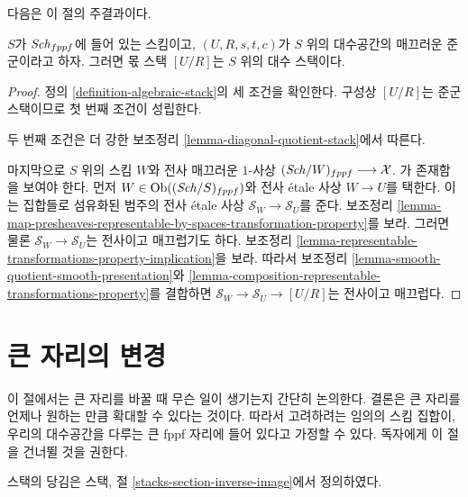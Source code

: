 \noindent
다음은 이 절의 주결과이다.

\begin{theorem}
\label{theorem-smooth-groupoid-gives-algebraic-stack}
$S$가 $\mathit{Sch}_{fppf}$에 들어 있는 스킴이고,
$(U, R, s, t, c)$가 $S$ 위의 대수공간의 매끄러운 준군이라고 하자. 그러면
몫 스택 $[U/R]$는 $S$ 위의 대수 스택이다.
\end{theorem}

\begin{proof}
정의 \ref{definition-algebraic-stack}의 세 조건을 확인한다. 구성상
$[U/R]$는 준군 스택이므로 첫 번째 조건이 성립한다.

\medskip\noindent
두 번째 조건은 더 강한 보조정리 \ref{lemma-diagonal-quotient-stack}에서
따른다.

\medskip\noindent
마지막으로 $S$ 위의 스킴 $W$와 전사 매끄러운 $1$-사상
$(\mathit{Sch}/W)_{fppf} \longrightarrow \mathcal{X}$.
가 존재함을 보여야 한다. 먼저 $W \in \mathop{\mathrm{Ob}}\nolimits((\mathit{Sch}/S)_{fppf})$와 전사
\'etale 사상 $W \to U$를 택한다. 이는 집합들로 섬유화된 범주의 전사
\'etale 사상 $\mathcal{S}_W \to \mathcal{S}_U$를 준다. 보조정리
\ref{lemma-map-presheaves-representable-by-spaces-transformation-property}를
보라. 그러면 물론 $\mathcal{S}_W \to \mathcal{S}_U$는 전사이고
매끄럽기도 하다. 보조정리
\ref{lemma-representable-transformations-property-implication}을 보라.
따라서 보조정리 \ref{lemma-smooth-quotient-smooth-presentation}와
\ref{lemma-composition-representable-transformations-property}를 결합하면
$\mathcal{S}_W \to \mathcal{S}_U \to [U/R]$는 전사이고 매끄럽다.
\end{proof}





\section{큰 자리의 변경}
\label{section-change-big-site}

\noindent
이 절에서는 큰 자리를 바꿀 때 무슨 일이 생기는지 간단히 논의한다.
결론은 큰 자리를 언제나 원하는 만큼 확대할 수 있다는 것이다. 따라서
고려하려는 임의의 스킴 집합이, 우리의 대수공간을 다루는 큰 fppf 자리에
들어 있다고 가정할 수 있다. 독자에게 이 절을 건너뛸 것을 권한다.

\medskip\noindent
스택의 당김은 스택, 절 \ref{stacks-section-inverse-image}에서 정의하였다.

